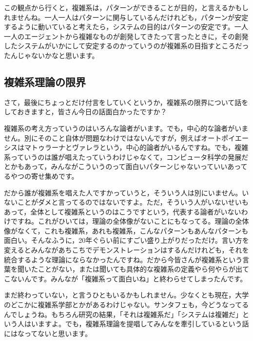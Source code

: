 \documentclass{ltjsbook}
\begin{document}
この観点から行くと，複雑系は，パターンができることが目的，と言えるかもしれませんね。一人一人はパターンに関与しているんだけれども，パターンが安定するように動いていると考えたら，システムの目的はパターンの安定です。一人一人のエージェントから複雑なものが創発してきたって言ったときに，その創発したシステムがいかにして安定するのかっていうのが複雑系の目指すところだったんじゃないかなと思います。

\subsection{複雑系理論の限界}
さて，最後にちょっとだけ付言をしていくというか，複雑系の限界について話をしておきますと，皆さん今日の話面白かったですか？

複雑系の考え方っていうのはいろんな論者がいます。でも，中心的な論者がいません。別にそのこと自体が問題なわけではないんですが，例えばオートポイエーシスはマトゥラーナとヴァレラという，中心的論者がいるんですね。でも，複雑系っていうのは誰が唱えたっていうわけじゃなくて，コンピュータ科学の発展だとかもあって，みんながこういうのって面白いパターンじゃないっていいあってるやつの寄せ集めです。

だから誰が複雑系を唱えた人ですかっていうと，そういう人は別にいません。いないことがダメと言ってるのではないですよ。ただ，そういう人がいないせいもあって，全体として複雑系というのはこうですという，代表する論者がいないわけですね。これがひいては，理論の全体像がないことにもなってる。理論の全体像がなくて，これも複雑系，あれも複雑系，こんなパターンもあんなパターンも面白い。そんなふうに，20年ぐらい前にすごい盛り上がりだっただけ。言い方を変えるとみんながあちこちでデモンストレーションはするんだけれども，それを統合するような理論にならなかったんですね。だから今皆さんが複雑系という言葉を聞いたことがない，または聞いても具体的な複雑系の定義やら何やらが出てこないんです。みんなが「複雑系って面白いね」と終わらせてしまったんです。

まだ終わっていない，と言うひともいるかもしれません。少なくとも現在，大学のどこかに複雑系学部とかがあるわけじゃない。サンタフェも，今どうなってるんでしょうね。もちろん研究の結果，「それは複雑系だ」「システムは複雑だ」という人はいますよ。でも，複雑系理論を提唱してみんなを牽引しているという話にはなってないと思います。
\end{document}
